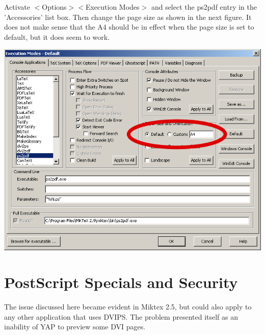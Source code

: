Activate
$<$Options$>$$<$Execution Modes$>$ and select the ps2pdf entry in the 'Accessories' list box. Then change the page size as shown in the next figure. It does not make sense that the A4 should be in effect when the page size is set to default, but it does seem to work.

\centerline{\includegraphics[bb= 0 0 696 543,width=\textwidth]{eps/ps2pdfpagesize.png}}

%






\section{PostScript Specials and Security}

The issue discussed here became evident in Miktex 2.5, but could also apply to any other application that uses DVIPS.  The problem presented itself as an inability of YAP to preview some DVI pages.


